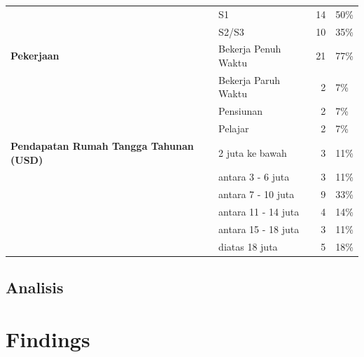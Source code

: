 \documentclass[lettersize,journal]{IEEEtran}
\begin{document}
\begin{table}[h!]
\begin{tabular}{@{}llrl@{}}
                                                   & S1                                        & 14        & 50\%        \\
                                                   & S2/S3                                    & 10        & 35\%        \\ \midrule
    \textbf{Pekerjaan}                             & Bekerja Penuh Waktu                      & 21        & 77\%        \\
                                                   & Bekerja Paruh Waktu                      & 2         & 7\%        \\
                                                   & Pensiunan                                & 2         & 7\%        \\
                                                   & Pelajar                                  & 2         & 7\%         \\ \midrule
    \textbf{Pendapatan Rumah Tangga Tahunan (USD)} & 2 juta ke bawah                          & 3         & 11\%        \\
                                                   & antara 3 - 6 juta                        & 3         & 11\%        \\
                                                   & antara 7 - 10 juta                       & 9         & 33\%        \\
                                                   & antara 11 - 14 juta                      & 4         & 14\%        \\
                                                   & antara 15 - 18 juta                      & 3         & 11\%        \\
                                                   & diatas 18 juta                           & 5         & 18\%        \\ \bottomrule
  \end{tabular}
\end{table}


\subsection{Analisis}



\section{Findings}
\end{document}
